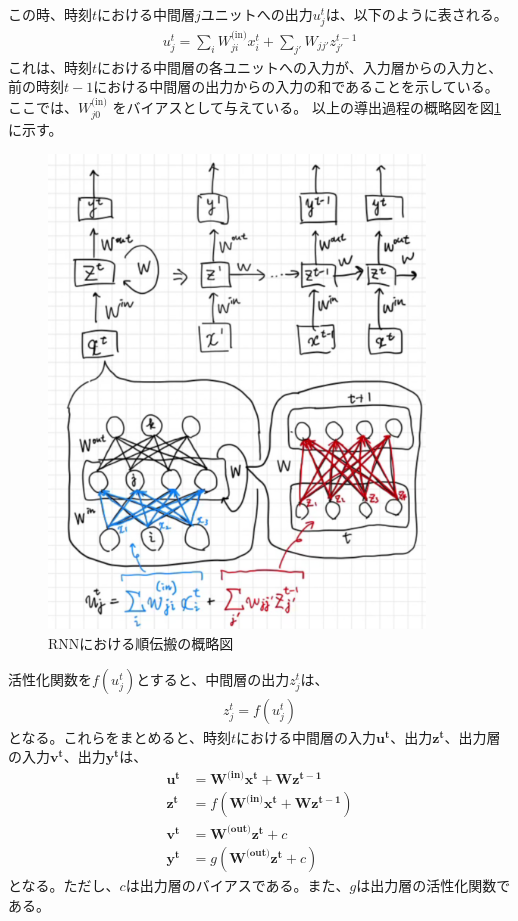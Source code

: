 \documentclass{ltjsarticle}
\begin{document}
この時、時刻$t$における中間層$j$ユニットへの出力$u^t_j$は、以下のように表される。
\begin{align}
  u^t_j = \sum_{i} W^{\text{(in)}}_{ji}x^t_i + \sum_{j'} W_{jj'}z^{t-1}_{j'}
\end{align}
これは、時刻$t$における中間層の各ユニットへの入力が、入力層からの入力と、前の時刻$t-1$における中間層の出力からの入力の和であることを示している。ここでは、$W^{\text{(in)}}_{j0}$ をバイアスとして与えている。
以上の導出過程の概略図を図\ref{fig:RNN_forward}に示す。
\begin{figure}[htbp]
  \centering
  \includegraphics[width=10cm]{./capture/RNN.png}
  \caption{RNNにおける順伝搬の概略図}
  \label{fig:RNN_forward}
\end{figure}

活性化関数を$f(u^t_j)$とすると、中間層の出力$z^t_j$は、
\begin{align}
  z^t_j = f(u^t_j)
\end{align}
となる。これらをまとめると、時刻$t$における中間層の入力$\mathbf{u^t}$、出力$\mathbf{z^t}$、出力層の入力$\mathbf{v^t}$、出力$\mathbf{y^t}$は、
\begin{align}
  \mathbf{u^t} &= \mathbf{W^{\text{(in)}}}\mathbf{x^t} + \mathbf{Wz^{t-1}}\\
  \mathbf{z^t} &= f(\mathbf{W^{\text{(in)}}}\mathbf{x^t} + \mathbf{Wz^{t-1}})\\
  \mathbf{v^t} &= \mathbf{W^{\text{(out)}}}\mathbf{z^t} + c\\
  \mathbf{y^t} &= g(\mathbf{W^{\text{(out)}}}\mathbf{z^t} + c)
\end{align}
となる。ただし、$c$は出力層のバイアスである。また、$g$は出力層の活性化関数である。
\end{document}
